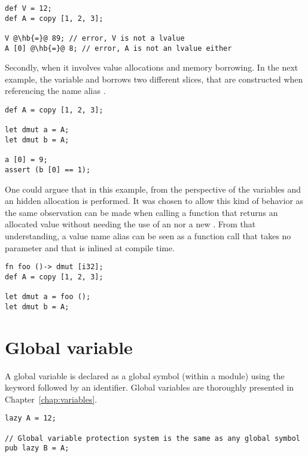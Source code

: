 \begin{lstlisting}[style=coloredverbatim, escapechar=@]
def V = 12;
def A = copy [1, 2, 3];

V @\hb{=}@ 89; // error, V is not a lvalue
A [0] @\hb{=}@ 8; // error, A is not an lvalue either
\end{lstlisting}

Secondly, when it involves value allocations and memory borrowing. In the next
example, the variable  and  borrows two different slices, that
are constructed when referencing the name alias .

\begin{lstlisting}[style=coloredverbatim]
def A = copy [1, 2, 3];

let dmut a = A;
let dmut b = A;

a [0] = 9;
assert (b [0] == 1);
\end{lstlisting}

One could arguee that in this example, from the perspective of the variables
 and  an hidden allocation is performed. It was chosen to
allow this kind of behavior as the same observation can be made when calling a
function that returns an allocated value without needing the use of an
 nor a new . From that understanding, a value name
alias can be seen as a function call that takes no parameter and that is inlined
at compile time.

\begin{lstlisting}[style=coloredverbatim]
fn foo ()-> dmut [i32];
def A = copy [1, 2, 3];

let dmut a = foo ();
let dmut b = A;
\end{lstlisting}

\vfill%
\pagebreak

\section{Global variable}%
\label{sec:global_variables}

A global variable is declared as a global symbol (within a module) using the
keyword  followed by an identifier. Global variables are thoroughly
presented in Chapter~\ref{chap:variables}.

\begin{lstlisting}[style=coloredverbatim]
lazy A = 12;

// Global variable protection system is the same as any global symbol
pub lazy B = A;
\end{lstlisting}

